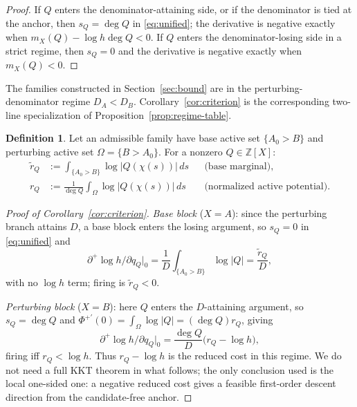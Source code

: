 \documentclass[11pt,reqno]{amsart}
\theoremstyle{plain}
\theoremstyle{definition}
\newtheorem{definition}[theorem]{Definition}
\theoremstyle{remark}
\newcommand{\Z}{\mathbb{Z}}
\newcommand{\rQ}{r_Q}
\newcommand{\dplus}{\partial^{+}}
\newcommand{\dA}{D_A}
\newcommand{\dB}{D_B}
\begin{document}
\begin{proof}
If $Q$ enters the denominator-attaining side, or if the denominator is tied at the
anchor, then $s_Q=\deg Q$ in \eqref{eq:unified}; the derivative is negative exactly when
$m_X(Q)-\log h\deg Q<0$.  If $Q$ enters the denominator-losing side in a strict regime,
then $s_Q=0$ and the derivative is negative exactly when $m_X(Q)<0$.
\end{proof}

The families constructed in Section~\ref{sec:bound} are in the perturbing-denominator
regime $\dA<\dB$.  Corollary~\ref{cor:criterion} is the corresponding two-line
specialization of Proposition~\ref{prop:regime-table}.

\begin{definition}\label{def:rq}
Let an admissible family have base active set $\{A_0>B\}$ and perturbing active set
$\Omega=\{B>A_0\}$. For a nonzero $Q\in\Z[X]$:
\begin{align*}
  \widetilde r_Q&:=\int_{\{A_0>B\}}\log|Q(\chi(s))|\,ds
  &&\text{(base marginal)},\\
  \rQ&:=\frac1{\deg Q}\int_\Omega\log|Q(\chi(s))|\,ds
  &&\text{(normalized active potential)}.
\end{align*}
\end{definition}

\begin{proof}[Proof of Corollary~\ref{cor:criterion}]
\emph{Base block} ($X=A$): since the perturbing branch attains $D$, a base block
enters the losing argument, so $s_Q=0$ in \eqref{eq:unified} and
\begin{equation}\label{eq:base-marg}
  \dplus\!\log h/\partial q_Q\big|_0=\frac1D\int_{\{A_0>B\}}\log|Q|
  =\frac{\widetilde r_Q}{D},
\end{equation}
with no $\log h$ term; firing is $\widetilde r_Q<0$.

\emph{Perturbing block} ($X=B$): here $Q$ enters the $D$-attaining argument, so
$s_Q=\deg Q$ and $\Phi^{+\prime}(0)=\int_\Omega\log|Q|=(\deg Q)\rQ$, giving
\begin{equation}\label{eq:marginal}
  \dplus\!\log h/\partial q_Q\big|_0=\frac{\deg Q}{D}\bigl(\rQ-\log h\bigr),
\end{equation}
firing iff $\rQ<\log h$.  Thus $\rQ-\log h$ is the reduced cost in this regime.  We do
not need a full KKT theorem in what follows; the only conclusion used is the local
one-sided one: a negative reduced cost gives a feasible first-order descent direction
from the candidate-free anchor.
\end{proof}
\end{document}
